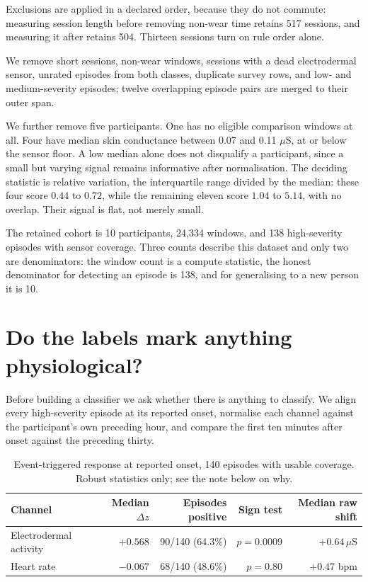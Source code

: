 \documentclass{article}
\begin{document}
Exclusions are applied in a declared order, because they do not commute:
measuring session length before removing non-wear time retains 517 sessions,
and measuring it after retains 504. Thirteen sessions turn on rule order alone.

We remove short sessions, non-wear windows, sessions with a dead electrodermal
sensor, unrated episodes from both classes, duplicate survey rows, and low- and
medium-severity episodes; twelve overlapping episode pairs are merged to their
outer span.

We further remove five participants. One has no eligible comparison windows at
all. Four have median skin conductance between 0.07  and
0.11 $\mu$S, at or below the sensor floor. A low median alone
does not disqualify a participant, since a small but varying signal remains
informative after normalisation. The deciding statistic is relative variation,
the interquartile range divided by the median: these four score $0.44$ to
$0.72$, while the remaining eleven score $1.04$ to $5.14$, with no overlap.
Their signal is flat, not merely small.

The retained cohort is 10 participants, 24{,}334 windows, and 138
high-severity episodes with sensor coverage. Three counts describe this dataset
and only two are denominators: the window count is a compute statistic, the
honest denominator for detecting an episode is 138, and for generalising to a
new person it is 10.

\section{Do the labels mark anything physiological?}
\label{sec:labels}

Before building a classifier we ask whether there is anything to classify. We
align every high-severity episode at its reported onset, normalise each channel
against the participant's own preceding hour, and compare the first ten minutes
after onset against the preceding thirty.

\begin{table}[t]
\caption{Event-triggered response at reported onset, 140 episodes with usable
coverage. Robust statistics only; see the note below on why.}
\label{tab:onset}
\centering
\begin{tabular}{lrrrr}
\toprule
Channel & Median $\Delta z$ & Episodes positive & Sign test & Median raw shift \\
\midrule
Electrodermal activity & $+0.568$ & 90/140 (64.3\%) & $p = 0.0009$ &
  $+0.64\,\mu\mathrm{S}$ \\
Heart rate & $-0.067$ & 68/140 (48.6\%) & $p = 0.80$ & $+0.47$ bpm \\
\bottomrule
\end{tabular}
\end{table}
\end{document}
